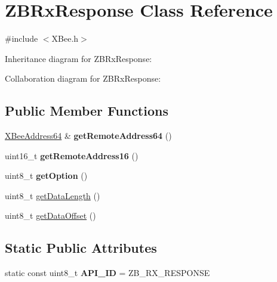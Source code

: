 \hypertarget{class_z_b_rx_response}{}\section{Z\+B\+Rx\+Response Class Reference}
\label{class_z_b_rx_response}


{\ttfamily \#include $<$X\+Bee.\+h$>$}



Inheritance diagram for Z\+B\+Rx\+Response\+:


Collaboration diagram for Z\+B\+Rx\+Response\+:
\subsection*{Public Member Functions}
\begin{DoxyCompactItemize}
\item 
\hypertarget{class_z_b_rx_response_a9af7b74ef6596f17312d7db042ba7e18}{}\label{class_z_b_rx_response_a9af7b74ef6596f17312d7db042ba7e18} 
\hyperlink{class_x_bee_address64}{X\+Bee\+Address64} \& {\bfseries get\+Remote\+Address64} ()
\item 
\hypertarget{class_z_b_rx_response_a5f7c9237a72e7f0107f2baf962ded78b}{}\label{class_z_b_rx_response_a5f7c9237a72e7f0107f2baf962ded78b} 
uint16\+\_\+t {\bfseries get\+Remote\+Address16} ()
\item 
\hypertarget{class_z_b_rx_response_a39ed277ac12274d7ae143a7cb27b219b}{}\label{class_z_b_rx_response_a39ed277ac12274d7ae143a7cb27b219b} 
uint8\+\_\+t {\bfseries get\+Option} ()
\item 
uint8\+\_\+t \hyperlink{class_z_b_rx_response_a9d2b73060d611bbdd581e0ceb195fd31}{get\+Data\+Length} ()
\item 
uint8\+\_\+t \hyperlink{class_z_b_rx_response_ad54e6ff3008f79d0ed32a78cc3d69151}{get\+Data\+Offset} ()
\end{DoxyCompactItemize}
\subsection*{Static Public Attributes}
\begin{DoxyCompactItemize}
\item 
\hypertarget{class_z_b_rx_response_a13b587296c6bb555f2c73a48e5ac4893}{}\label{class_z_b_rx_response_a13b587296c6bb555f2c73a48e5ac4893} 
static const uint8\+\_\+t {\bfseries A\+P\+I\+\_\+\+ID} = Z\+B\+\_\+\+R\+X\+\_\+\+R\+E\+S\+P\+O\+N\+SE
\end{DoxyCompactItemize}
